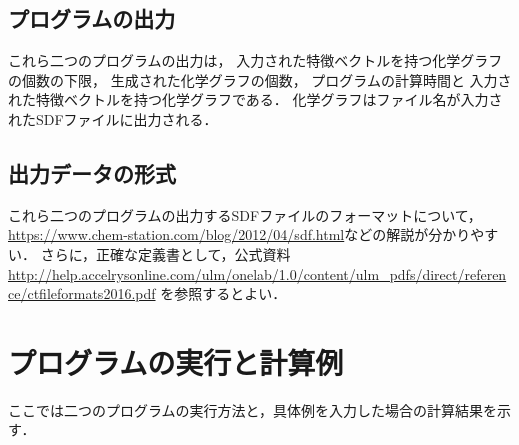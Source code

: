 \documentclass[11pt,titlepage,dvipdfmx,twoside]{jarticle}
\begin{document}
\subsection{プログラムの出力}
\label{sec:Output}

これら二つのプログラムの出力は，
入力された特徴ベクトルを持つ化学グラフの個数の下限，
生成された化学グラフの個数，
プログラムの計算時間と
入力された特徴ベクトルを持つ化学グラフである．
化学グラフはファイル名が入力されたSDFファイルに出力される．

\subsection{出力データの形式}
\label{sec:OutputFormat}

これら二つのプログラムの出力するSDFファイルのフォーマットについて，
\url{https://www.chem-station.com/blog/2012/04/sdf.html}などの解説が分かりやすい．
さらに，正確な定義書として，公式資料 \url{http://help.accelrysonline.com/ulm/onelab/1.0/content/ulm_pdfs/direct/reference/ctfileformats2016.pdf} を参照するとよい．



\bigskip




\section{プログラムの実行と計算例}
\label{sec:Example}

ここでは二つのプログラムの実行方法と，具体例を入力した場合の計算結果を示す．
\end{document}
